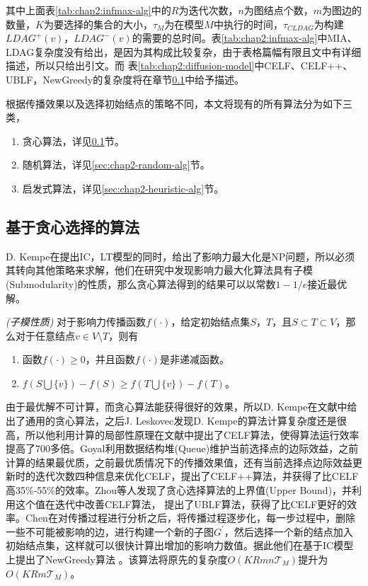 其中上面表\ref{tab:chap2:infmax-alg}中的$R$为迭代次数，$n$为图结点个数，$m$为图边的数量，$K$为要选择的集合的大小，$\tau_{M}$为在模型$M$中执行的时间，$\tau_{CLDAG}$为构建$LDAG^{+}(v)$，$LDAG^{-}(v)$的需要的总时间\cite{he2012influence}。表\ref{tab:chap2:infmax-alg}中MIA、LDAG复杂度没有给出，是因为其构成比较复杂，由于表格篇幅有限且文中有详细描述，所以只给出引文。而
表\ref{tab:chap2:diffusion-model}中CELF、CELF++、UBLF，NewGreedy的复杂度将在章节\ref{sec:chap2-greedy-alg}中给予描述。


根据传播效果以及选择初始结点的策略不同，本文将现有的所有算法分为如下三类，
\begin{enumerate}
\item 贪心算法，详见\ref{sec:chap2-greedy-alg}节。
\item 随机算法，详见\ref{sec:chap2-random-alg}节。
\item 启发式算法，详见\ref{sec:chap2-heuristic-alg}节。
\end{enumerate}



\subsection{基于贪心选择的算法}
\label{sec:chap2-greedy-alg}
D. Kempe\cite{kempe2003maximizing}在提出IC，LT模型的同时，给出了影响力最大化是NP问题，所以必须其转向其他策略来求解，他们在研究中发现影响力最大化算法具有子模(Submodularity)的性质，那么贪心算法得到的结果可以以常数$1-1/e$接近最优解。
\begin{definition}
\emph{(子模性质)}
对于影响力传播函数$f(\cdot)$，给定初始结点集$S$，$T$，且$S \subset T \subset V$，那么对于任意结点$v \in V\setminus T$，则有
\begin{enumerate}
\item 函数$f(\cdot) \geq 0$，并且函数$f(\cdot)$是非递减函数。
\item $f(S \bigcup \{v\}) -  f(S) \geq f(T \bigcup \{v\}) -  f(T)$。
\end{enumerate}
\end{definition}


由于最优解不可计算，而贪心算法能获得很好的效果，所以D. Kempe在文献\cite{kempe2003maximizing}中给出了通用的贪心算法，之后J. Leskovec发现D. Kempe的算法计算复杂度还是很高，所以他利用计算的局部性原理在文献\cite{leskovec2007cost}中提出了CELF算法，使得算法运行效率提高了700多倍。Goyal\cite{goyal2011celf++}利用数据结构堆(Queue)维护当前选择点的边际效益，之前计算的结果最优质，之前最优质情况下的传播效果值，还有当前选择点边际效益更新时的迭代次数四种信息来优化CELF，提出了CELF++算法，并获得了比CELF高35\%-55\%的效率。Zhou\cite{zhou2013ublf}等人发现了贪心选择算法的上界值(Upper Bound)，并利用这个值在迭代中改善CELF算法， 提出了UBLF算法，获得了比CELF更好的效率。Chen\cite{chen2009efficient}在对传播过程进行分析之后，将传播过程逐步化，每一步过程中，删除一些不可能被影响的边，进行构建一个新的子图$G^{'}$，然后选择一个新的结点加入初始结点集，这样就可以很快计算出增加的影响力数值。据此他们在基于IC模型上提出了NewGreedy算法
。该算法将原先的复杂度$O(KRmn\mathcal{T}_{M})$提升为$O(KRm\mathcal{T}_{M})$。


